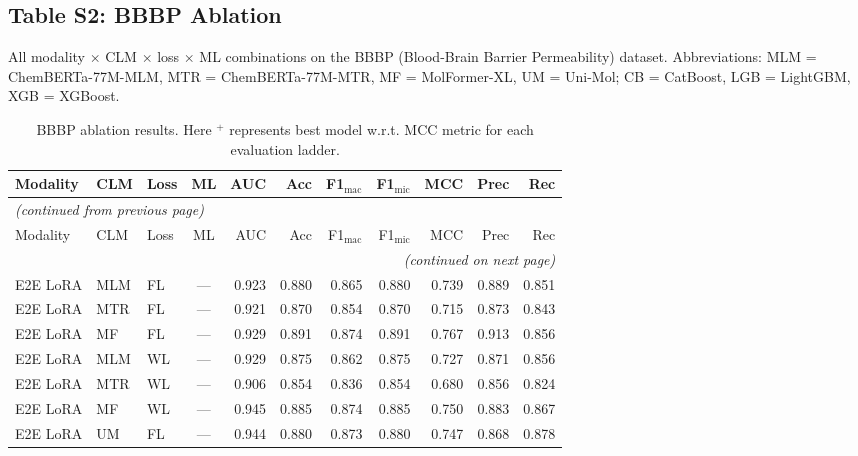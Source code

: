 \documentclass[9pt,a4paper]{article}
\begin{document}
\newpage

\subsection*{Table S2: BBBP Ablation}

All modality $\times$ CLM $\times$ loss $\times$ ML combinations on the BBBP
(Blood-Brain Barrier Permeability) dataset.
Abbreviations: MLM = ChemBERTa-77M-MLM, MTR = ChemBERTa-77M-MTR,
MF = MolFormer-XL, UM = Uni-Mol; CB = CatBoost, LGB = LightGBM, XGB = XGBoost.

\begin{scriptsize}
\begin{longtable}{lllcrrrrrrr}
\caption{BBBP ablation results. Here $^{+}$ represents best model w.r.t. MCC metric for each evaluation ladder.}
\label{tab:s2_bbbp} \\
\toprule
Modality & CLM & Loss & ML & AUC & Acc & F1$_\text{mac}$ & F1$_\text{mic}$ & MCC & Prec & Rec \\
\midrule
\endfirsthead
\multicolumn{11}{l}{\footnotesize\textit{(continued from previous page)}} \\
\toprule
Modality & CLM & Loss & ML & AUC & Acc & F1$_\text{mac}$ & F1$_\text{mic}$ & MCC & Prec & Rec \\
\midrule
\endhead
\midrule
\multicolumn{11}{r}{\footnotesize\textit{(continued on next page)}} \\
\endfoot
\bottomrule
\endlastfoot
E2E LoRA & MLM & FL & --- & 0.923 & 0.880 & 0.865 & 0.880 & 0.739 & 0.889 & 0.851 \\
E2E LoRA & MTR & FL & --- & 0.921 & 0.870 & 0.854 & 0.870 & 0.715 & 0.873 & 0.843 \\
E2E LoRA & MF & FL & --- & 0.929 & 0.891 & 0.874 & 0.891 & 0.767 & 0.913 & 0.856 \\
E2E LoRA & MLM & WL & --- & 0.929 & 0.875 & 0.862 & 0.875 & 0.727 & 0.871 & 0.856 \\
E2E LoRA & MTR & WL & --- & 0.906 & 0.854 & 0.836 & 0.854 & 0.680 & 0.856 & 0.824 \\
E2E LoRA & MF  & WL & --- & 0.945 & 0.885 & 0.874 & 0.885 & 0.750 & 0.883 & 0.867 \\
E2E LoRA & UM  & FL & --- & 0.944 & 0.880 & 0.873 & 0.880 & 0.747 & 0.868 & 0.878 \\

\end{longtable}
\end{scriptsize}
\end{document}
